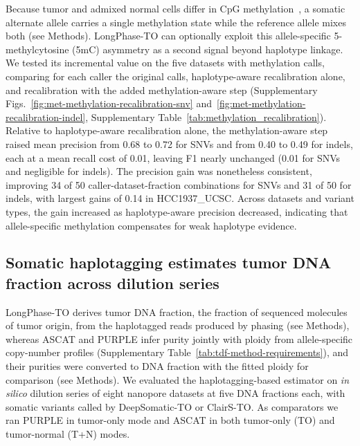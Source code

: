 \documentclass[pdflatex,sn-nature]{sn-jnl}
\begin{document}
Because tumor and admixed normal cells differ in CpG methylation~\cite{recillastarga2022,zheng2017,zhang2015}, a somatic alternate allele carries a single methylation state while the reference allele mixes both (see Methods). LongPhase-TO can optionally exploit this allele-specific 5-methylcytosine (5mC) asymmetry as a second signal beyond haplotype linkage. We tested its incremental value on the five datasets with methylation calls, comparing for each caller the original calls, haplotype-aware recalibration alone, and recalibration with the added methylation-aware step (Supplementary Figs.~\ref{fig:met-methylation-recalibration-snv} and~\ref{fig:met-methylation-recalibration-indel}, Supplementary Table~\ref{tab:methylation_recalibration}). Relative to haplotype-aware recalibration alone, the methylation-aware step raised mean precision from 0.68 to 0.72 for SNVs and from 0.40 to 0.49 for indels, each at a mean recall cost of 0.01, leaving F1 nearly unchanged (0.01 for SNVs and negligible for indels). The precision gain was nonetheless consistent, improving 34 of 50 caller-dataset-fraction combinations for SNVs and 31 of 50 for indels, with largest gains of 0.14 in HCC1937\_UCSC. Across datasets and variant types, the gain increased as haplotype-aware precision decreased, indicating that allele-specific methylation compensates for weak haplotype evidence.

\subsection{Somatic haplotagging estimates tumor DNA fraction across dilution series}
LongPhase-TO derives tumor DNA fraction, the fraction of sequenced molecules of tumor origin, from the haplotagged reads produced by phasing (see Methods), whereas ASCAT and PURPLE infer purity jointly with ploidy from allele-specific copy-number profiles (Supplementary Table~\ref{tab:tdf-method-requirements}), and their purities were converted to DNA fraction with the fitted ploidy for comparison (see Methods). We evaluated the haplotagging-based estimator on \emph{in silico} dilution series of eight nanopore datasets at five DNA fractions each, with somatic variants called by DeepSomatic-TO or ClairS-TO. As comparators we ran PURPLE in tumor-only mode and ASCAT in both tumor-only (TO) and tumor-normal (T+N) modes.
\end{document}
